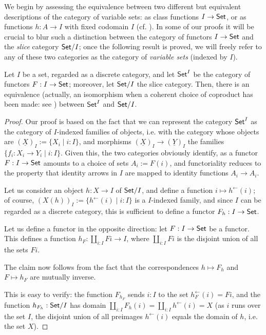 We begin by assessing the equivalence between two different but equivalent descriptions of the category of variable sets: as class functions $I \to \mathsf{Set}$, or as functions $h : A \to I$ with fixed codomain $I$ (cf. \cite[1.6.1]{Bor1}). In some of our proofs it will be crucial to blur such a distinction between the category of functors $I \to \mathsf{Set}$ and the \emph{slice} category $\mathsf{Set}/I$; once the following result is proved, we will freely refer to any of these two categories as the category of \emph{variable sets} (indexed by $I$).
\begin{proposition}\label{variabbo_set}
  Let $I$ be a set, regarded as a discrete category, and let $\mathsf{Set}^I$ be the category of functors $F : I \to \mathsf{Set}$; moreover, let $\mathsf{Set}/I$ the slice category. Then, there is an equivalence (actually, an isomorphism when a coherent choice of coproduct has been made: see \cite[1.5.1]{Bor1}) between $\mathsf{Set}^I$ and $\mathsf{Set}/I$.
\end{proposition}
\begin{proof}
  Our proof is based on the fact that we can represent the category $\mathsf{Set}^I$ as the category of $I$-indexed families of objects, i.e. with the category whose objects are $(\underline X)_I := \{X_i\mid i: I\}$, and morphisms $(\underline X)_I\to (\underline Y)_I$ the families $\{f_i : X_i \to Y_i\mid i : I\}$. Given this, the two categories obviously identify, as a functor $F : I \to \mathsf{Set}$ amounts to a choice of sets $A_i := F(i)$, and functoriality reduces to the property that identity arrows in $I$ are mapped to identity functions $A_i \to A_i$.

  Let us consider an object $h : X\to I$ of $\mathsf{Set}/I$, and define a function $i\mapsto h^\leftarrow(i)$; of course, $(X(h))_I := \{h^\leftarrow(i) \mid i : I\}$ is a $I$-indexed family, and since $I$ can be regarded as a discrete category, this is sufficient to define a functor $F_h : I \to \mathsf{Set}$.

  Let us define a functor in the opposite direction: let $F : I \to \mathsf{Set}$ be a functor. This defines a function $h_F : \coprod_{i: I}Fi \to I$, where $\coprod_{i: I} Fi$ is the disjoint union of all the sets $Fi$.

  The claim now follows from the fact that the correspondences $h\mapsto F_h$ and $F\mapsto h_F$ are mutually inverse.

  This is easy to verify: the function $F_{h_F}$ sends $i: I$ to the set $h_F^\leftarrow(i)=Fi$, and the function $h_{F_h} : \mathsf{Set}/I$ has domain $\coprod_{i: I}F_h(i) = \coprod_{i: I}h^\leftarrow(i)=X$ (as $i$ runs over the set $I$, the disjoint union of all preimages $h^\leftarrow(i)$ equals the domain of $h$, i.e. the set $X$).
\end{proof}
